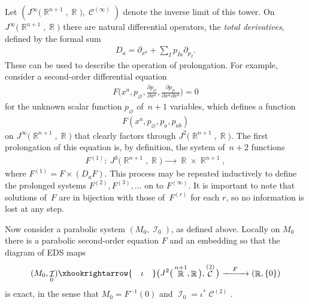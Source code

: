\documentclass[10pt,a4paper]{amsart}
\DeclareMathOperator{\R}{\mathbb{R}}
\DeclareMathOperator{\I}{\mathcal{I}}
\DeclareMathOperator{\contact}{\mathcal{C}}
\newcommand{\pDeriv}[2]{\frac{\partial #1}{\partial #2}}
\newcommand{\jet}[1]{J^{#1}\big(\R^{n+1},\R\big)}
\numberwithin{equation}{section}
\begin{document}
Let $(\jet{\infty}, \contact^{(\infty)})$ denote the inverse limit of this tower. On $\jet{\infty}$ there are natural differential operators, the \emph{total derivatives}, defined by the formal sum
\begin{gather*}
D_a = \partial_{x^a} + \sum_I p_{Ia}\partial_{p_I} .
\end{gather*}
These can be used to describe the operation of prolongation. For example, consider a second-order differential equation
\begin{gather*}
F\bigg(x^a, p_\varnothing, \pDeriv{p_\varnothing}{x^a}, \pDeriv{p_\varnothing}{x^a \partial x^b}\bigg) = 0
\end{gather*}
for the unknown scalar function $p_\varnothing$ of~$n+1$ variables, which defines a function
\begin{gather*}
F(x^a, p_\varnothing, p_a, p_{ab})
\end{gather*}
on $\jet{\infty}$ that clearly factors through $\jet{2}$. The first prolongation of this equation is, by definition, the system of~$n+2$ functions
\begin{gather*}
F^{(1)} \colon\ \jet{3} \xrightarrow{\qquad} \R\times\R^{n+1} ,
\end{gather*}
where $F^{(1)} = F\times(D_a F)$.
This process may be repeated inductively to define the prolonged systems $F^{(2)}, F^{(3)}, \dots$ on to $F^{(\infty)}$. It is important to note that solutions of~$F$ are in bijection with those of~$F^{(r)}$ for each $r$, so no information is lost at any step.

 Now consider a parabolic system $(M_0, \I_0)$, as defined above. Locally on $M_0$ there is a parabolic second-order equation $F$ and an embedding so that the diagram of EDS maps
 \begin{gather*}
 (M_0, \I_0) \xhookrightarrow{\quad \iota \quad} \big(\jet{2}, \contact^{(2)}\big) \xrightarrow{\quad F \quad} (\R, \{0\})
 \end{gather*}
 is exact, in the sense that $M_0 = F^{-1}(0)$ and $\I_0 = \iota^*\contact^{(2)}$.
\end{document}
